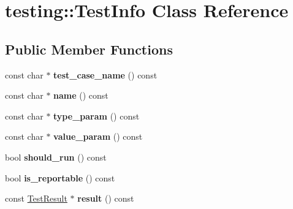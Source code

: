 \hypertarget{classtesting_1_1_test_info}{}\section{testing\+:\+:Test\+Info Class Reference}
\label{classtesting_1_1_test_info}
\subsection*{Public Member Functions}
\begin{DoxyCompactItemize}
\item 
\hypertarget{classtesting_1_1_test_info_a26d22556d04b94c9cd15e28d74fef91c}{}const char $\ast$ {\bfseries test\+\_\+case\+\_\+name} () const \label{classtesting_1_1_test_info_a26d22556d04b94c9cd15e28d74fef91c}

\item 
\hypertarget{classtesting_1_1_test_info_ab3d24cad310f0cde29a80b9a83949ff5}{}const char $\ast$ {\bfseries name} () const \label{classtesting_1_1_test_info_ab3d24cad310f0cde29a80b9a83949ff5}

\item 
\hypertarget{classtesting_1_1_test_info_af15d5c533a7237ffc183bc4c924dfcf4}{}const char $\ast$ {\bfseries type\+\_\+param} () const \label{classtesting_1_1_test_info_af15d5c533a7237ffc183bc4c924dfcf4}

\item 
\hypertarget{classtesting_1_1_test_info_a9671fbc0effcb32e98803888dc166a66}{}const char $\ast$ {\bfseries value\+\_\+param} () const \label{classtesting_1_1_test_info_a9671fbc0effcb32e98803888dc166a66}

\item 
\hypertarget{classtesting_1_1_test_info_a240c9fb051d7b0586ed380c6b4e729e4}{}bool {\bfseries should\+\_\+run} () const \label{classtesting_1_1_test_info_a240c9fb051d7b0586ed380c6b4e729e4}

\item 
\hypertarget{classtesting_1_1_test_info_a7ad90aeebb1d6fe3a43c6e3e3427e382}{}bool {\bfseries is\+\_\+reportable} () const \label{classtesting_1_1_test_info_a7ad90aeebb1d6fe3a43c6e3e3427e382}

\item 
\hypertarget{classtesting_1_1_test_info_addea8766df3b8abe4cc4103218a49a65}{}const \hyperlink{classtesting_1_1_test_result}{Test\+Result} $\ast$ {\bfseries result} () const \label{classtesting_1_1_test_info_addea8766df3b8abe4cc4103218a49a65}


\end{DoxyCompactItemize}
